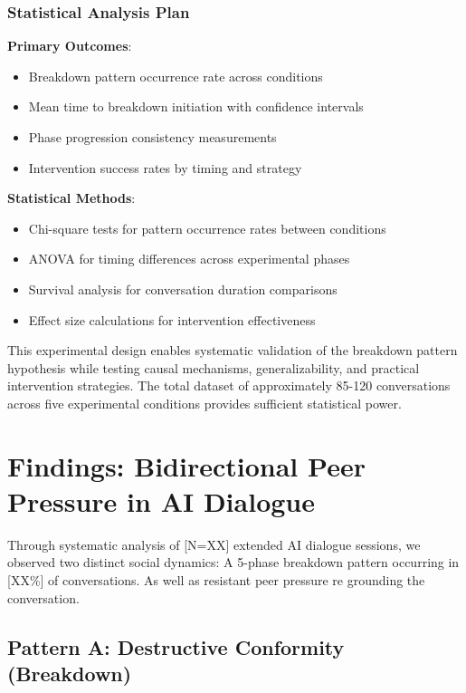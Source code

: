 \documentclass[11pt,letterpaper]{article}
\newcommand{\totalSessions}{[N=XX]} %
\newcommand{\breakdownPercentage}{[XX\%]} %
\begin{document}
\subsubsection{Statistical Analysis Plan}

\textbf{Primary Outcomes}:
\begin{itemize}
    \item Breakdown pattern occurrence rate across conditions
    \item Mean time to breakdown initiation with confidence intervals
    \item Phase progression consistency measurements
    \item Intervention success rates by timing and strategy
\end{itemize}

\textbf{Statistical Methods}:
\begin{itemize}
    \item Chi-square tests for pattern occurrence rates between conditions
    \item ANOVA for timing differences across experimental phases
    \item Survival analysis for conversation duration comparisons
    \item Effect size calculations for intervention effectiveness
\end{itemize}

This experimental design enables systematic validation of the breakdown pattern hypothesis while testing causal mechanisms, generalizability, and practical intervention strategies. The total dataset of approximately 85-120 conversations across five experimental conditions provides sufficient statistical power.

\section{Findings: Bidirectional Peer Pressure in AI Dialogue}

Through systematic analysis of \totalSessions{} extended AI dialogue sessions, we observed two distinct social dynamics: A 5-phase breakdown pattern occurring in \breakdownPercentage{} of conversations. As well as resistant peer pressure re grounding the conversation.

\subsection{Pattern A: Destructive Conformity (Breakdown)}
\end{document}
